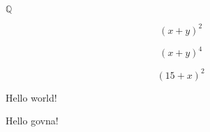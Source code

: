\documentclass{amsart} %
\newcommand{\field}[1]{\mathbb{#1}}
\newcommand{\greet}[1][world]{Hello #1!}
\newcommand{\plusbinomial}[3][2]{(#2 + #3)^#1}
\begin{document}
$\field{Q}$

\[\plusbinomial{x}{y}\]  %

\[\plusbinomial[4]{x}{y}\] %

\[\plusbinomial{15}{x}\]

\greet

\greet[govna]
\end{document}

